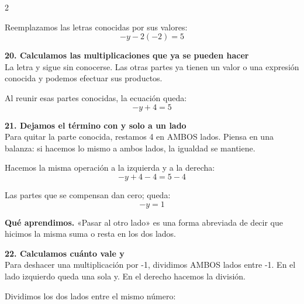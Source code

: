\documentclass[11pt,a4paper,landscape]{article}
\begin{document}
\begin{multicols*}{2}
\begin{minipage}{\linewidth}
\par\smallskip Reemplazamos las letras conocidas por sus valores:
\[-y - 2\left(-2\right)=5\]
\end{minipage}\par\medskip
\noindent\begin{minipage}{\linewidth}\textbf{20. Calculamos las multiplicaciones que ya se pueden hacer}\\[2pt]La letra y sigue sin conocerse. Las otras partes ya tienen un valor o una expresión conocida y podemos efectuar sus productos.
\par{}\par\smallskip
\par\smallskip Al reunir esas partes conocidas, la ecuación queda:
\[-y + 4=5\]
\end{minipage}\par\medskip
\noindent\begin{minipage}{\linewidth}\textbf{21. Dejamos el término con y solo a un lado}\\[2pt]Para quitar la parte conocida, restamos 4 en AMBOS lados. Piensa en una balanza: si hacemos lo mismo a ambos lados, la igualdad se mantiene.
\par\smallskip Hacemos la misma operación a la izquierda y a la derecha:
\[-y + 4 - 4=5 - 4\]
\par\smallskip Las partes que se compensan dan cero; queda:
\[-y=1\]
\par\smallskip\textbf{Qué aprendimos.} «Pasar al otro lado» es una forma abreviada de decir que hicimos la misma suma o resta en los dos lados.
\end{minipage}\par\medskip
\noindent\begin{minipage}{\linewidth}\textbf{22. Calculamos cuánto vale y}\\[2pt]Para deshacer una multiplicación por -1, dividimos AMBOS lados entre -1. En el lado izquierdo queda una sola y. En el derecho hacemos la división.
\par\smallskip Dividimos los dos lados entre el mismo número:

\end{minipage}
\end{multicols*}
\end{document}

